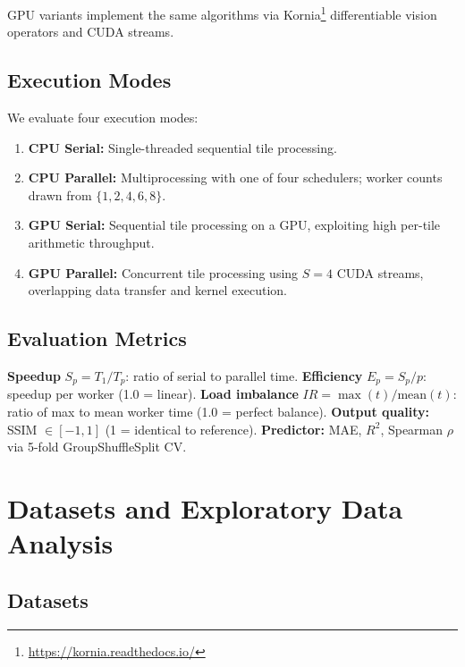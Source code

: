 \documentclass[acmsmall]{acmart}
\begin{document}
GPU variants implement the same algorithms via Kornia\footnote{\url{https://kornia.readthedocs.io/}} differentiable vision operators and CUDA streams.

\subsection{Execution Modes}

We evaluate four execution modes:

\begin{enumerate}
  \item \textbf{CPU Serial:} Single-threaded sequential tile processing.

  \item \textbf{CPU Parallel:} Multiprocessing with one of four schedulers; worker counts drawn from $\{1, 2, 4, 6, 8\}$.

  \item \textbf{GPU Serial:} Sequential tile processing on a GPU, exploiting high per-tile arithmetic throughput.

  \item \textbf{GPU Parallel:} Concurrent tile processing using $S = 4$ CUDA streams, overlapping data transfer and kernel execution.
\end{enumerate}

\subsection{Evaluation Metrics}

\textbf{Speedup} $S_p = T_1 / T_p$: ratio of serial to parallel time. \textbf{Efficiency} $E_p = S_p / p$: speedup per worker (1.0 = linear). \textbf{Load imbalance} $IR = \max(t) / \mathrm{mean}(t)$: ratio of max to mean worker time (1.0 = perfect balance). \textbf{Output quality:} SSIM $\in [-1, 1]$ (1 = identical to reference). \textbf{Predictor:} MAE, $R^2$, Spearman $\rho$ via 5-fold GroupShuffleSplit CV.

\section{Datasets and Exploratory Data Analysis}\label{sec:datasets}

\subsection{Datasets}
\end{document}
